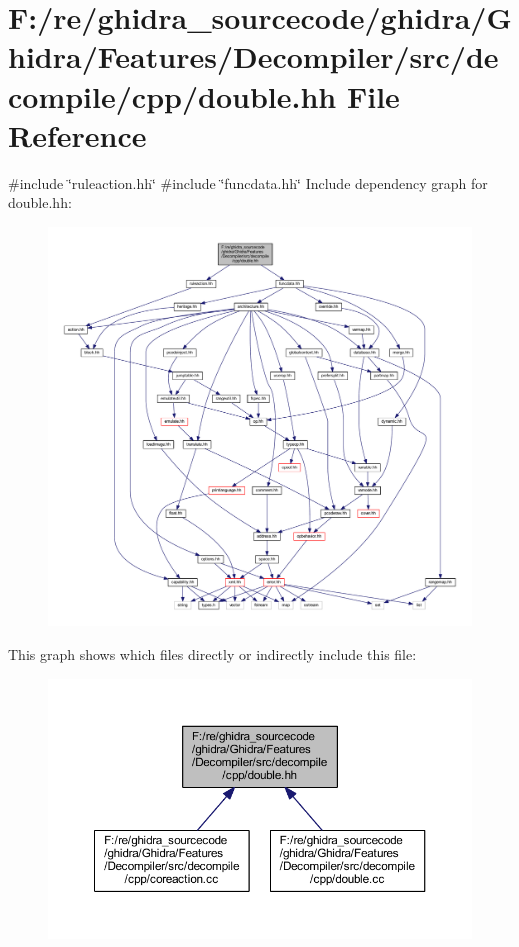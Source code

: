 \hypertarget{double_8hh}{}\section{F\+:/re/ghidra\+\_\+sourcecode/ghidra/\+Ghidra/\+Features/\+Decompiler/src/decompile/cpp/double.hh File Reference}
\label{double_8hh}
{\ttfamily \#include \char`\"{}ruleaction.\+hh\char`\"{}}\newline
{\ttfamily \#include \char`\"{}funcdata.\+hh\char`\"{}}\newline
Include dependency graph for double.\+hh\+:
\nopagebreak
\begin{figure}[H]
\begin{center}
\leavevmode
\includegraphics[width=350pt]{double_8hh__incl}
\end{center}
\end{figure}
This graph shows which files directly or indirectly include this file\+:
\nopagebreak
\begin{figure}[H]
\begin{center}
\leavevmode
\includegraphics[width=350pt]{double_8hh__dep__incl}
\end{center}
\end{figure}
